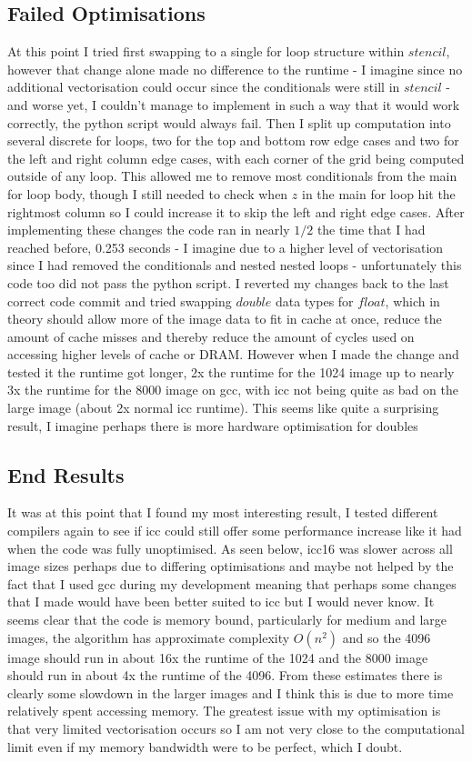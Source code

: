 \documentclass{article}
\begin{document}
    \subsection{Failed Optimisations}
    At this point I tried first swapping to a single for loop structure within $stencil$, however that change alone made no difference to the runtime - I imagine
    since no additional vectorisation could occur since the conditionals were still in $stencil$ - and worse yet, I couldn't manage to implement in such a way that
    it would work correctly, the python script would always fail.
    Then I split up computation into several discrete for loops, two for the top and bottom row edge cases and two for the left and right column edge cases, with
    each corner of the grid being computed outside of any loop. This allowed me to remove most conditionals from the main for loop body, though I still needed
    to check when $z$ in the main for loop hit the rightmost column so I could increase it to skip the left and right edge cases.
    After implementing these changes the code ran in nearly $1/2$ the time that I had reached before, 0.253 seconds - I imagine due to a higher level of vectorisation
    since I had removed the conditionals and nested nested loops - unfortunately this code too did not pass the python script.
    I reverted my changes back to the last correct code commit and tried swapping $double$ data types for $float$, which in theory should allow more of the 
    image data to fit in cache at once, reduce the amount of cache misses and thereby reduce the amount of cycles used on accessing higher levels of cache or DRAM.
    However when I made the change and tested it the runtime got longer, 2x the runtime for the 1024 image up to nearly 3x the runtime for the 8000 image on gcc, with
    icc not being quite as bad on the large image (about 2x normal icc runtime).
    This seems like quite a surprising result, I imagine perhaps there is more hardware optimisation for doubles
    \subsection{End Results}
    It was at this point that I found my most interesting result, I tested different compilers again to see if icc could still offer some performance increase like
    it had when the code was fully unoptimised. As seen below, icc16 was slower across all image sizes perhaps due to differing optimisations and maybe not helped
    by the fact that I used gcc during my development meaning that perhaps some changes that I made would have been better suited to icc but I would never know.
    It seems clear that the code is memory bound, particularly for medium and large images, the algorithm has approximate complexity $O(n^2)$ and so the 4096 image
    should run in about 16x the runtime of the 1024 and the 8000 image should run in about 4x the runtime of the 4096. From these estimates there is clearly some
    slowdown in the larger images and I think this is due to more time relatively spent accessing memory.
    The greatest issue with my optimisation is that very limited vectorisation occurs so I am not very close to the computational limit even if my memory bandwidth were to be perfect, which I doubt. 
    
\end{document}
